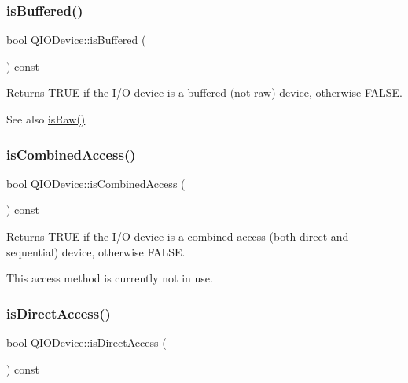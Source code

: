 \subsubsection{\texorpdfstring{isBuffered()}{isBuffered()}}
{\footnotesize\ttfamily bool Q\+I\+O\+Device\+::is\+Buffered (\begin{DoxyParamCaption}{ }\end{DoxyParamCaption}) const\hspace{0.3cm}{\ttfamily [inline]}}

Returns T\+R\+UE if the I/O device is a buffered (not raw) device, otherwise F\+A\+L\+SE. \begin{DoxySeeAlso}{See also}
\mbox{\hyperlink{class_q_i_o_device_a66e1eb78420a4ec15685871e2e773f68}{is\+Raw()}} 
\end{DoxySeeAlso}
\mbox{\label{class_q_i_o_device_a4cddfb1842e6392b0dbae21a217fef46}} 
\subsubsection{\texorpdfstring{isCombinedAccess()}{isCombinedAccess()}}
{\footnotesize\ttfamily bool Q\+I\+O\+Device\+::is\+Combined\+Access (\begin{DoxyParamCaption}{ }\end{DoxyParamCaption}) const\hspace{0.3cm}{\ttfamily [inline]}}

Returns T\+R\+UE if the I/O device is a combined access (both direct and sequential) device, otherwise F\+A\+L\+SE.

This access method is currently not in use. \mbox{\label{class_q_i_o_device_ace782017b9a264d7d1759223add28ae7}} 
\subsubsection{\texorpdfstring{isDirectAccess()}{isDirectAccess()}}
{\footnotesize\ttfamily bool Q\+I\+O\+Device\+::is\+Direct\+Access (\begin{DoxyParamCaption}{ }\end{DoxyParamCaption}) const\hspace{0.3cm}{\ttfamily [inline]}}

